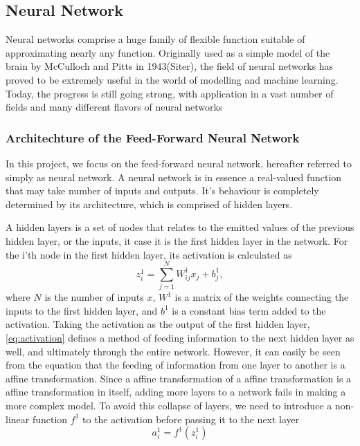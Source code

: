 \subsection{Neural Network}\label{sec:dnn theory}
Neural networks comprise a huge family of flexible function suitable of approximating nearly any function. Originally used as a simple model of the brain 
by McCulloch and Pitts in 1943(Siter), the field of neural networks has proved to be extremely useful in the world of modelling and machine learning. Today, the progress is still going strong, with application in a vast number of fields and many different flavors of neural networks

\subsubsection{Architechture of the Feed-Forward Neural Network}
In this project, we focus on the feed-forward neural network, hereafter referred
to simply as neural network. A neural network is in essence a real-valued function that may take number of inputs and outputs. It's behaviour is completely determined by its architecture, which is comprised of hidden layers.

A hidden layers is a set of nodes that relates to the emitted values of the 
previous hidden layer, or the inputs, it case it is the first hidden layer in the 
network. For the i'th node in the first hidden layer, its activation is 
calculated as
\begin{equation}\label{eq:activation}
    z^1_i = \sum_{j=1}^N W^1_{ij}x_j + b^1_j,
\end{equation}
where $N$ is the number of inputs $x$, $W^1$ is a matrix of the weights connecting the inputs to the first hidden layer, and $b^1$ is a constant bias term added to the activation. Taking the activation as the output of the first hidden layer, \autoref{eq:activation} defines a method of feeding information to the next hidden layer as well, and ultimately through the entire network. However, it can easily be seen from the equation that the feeding of information from one layer to another is a affine transformation. Since a affine transformation of a affine transformation is a affine transformation in itself, adding more layers to a network fails in making a more complex model. To avoid this collapse of 
layers, we need to introduce a non-linear function $f^1$ to the activation before 
passing it to the next layer
\begin{equation}\label{eq:non_linear}
    a^1_i = f^1(z^1_i)
\end{equation}

